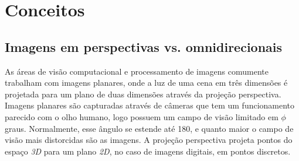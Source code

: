 \documentclass[cic,tc]{iiufrgs}
\begin{document}
\chapter{Conceitos}

\section{Imagens em perspectivas vs. omnidirecionais}

As áreas de visão computacional e processamento de imagens comumente trabalham com imagens planares, onde a luz de uma cena em três dimensões é projetada para um plano de duas dimensões através da projeção perspectiva. Imagens planares são capturadas através de câmeras que tem um funcionamento parecido com o olho humano, logo possuem um campo de visão limitado em $\phi$ graus. Normalmente, esse ângulo se estende até 180\degree, e quanto maior o campo de visão mais distorcidas são as imagens. 
A projeção perspectiva projeta pontos do espaço \textit{3D} para um plano \textit{2D}, no caso de imagens digitais, em pontos discretos. 
\end{document}
